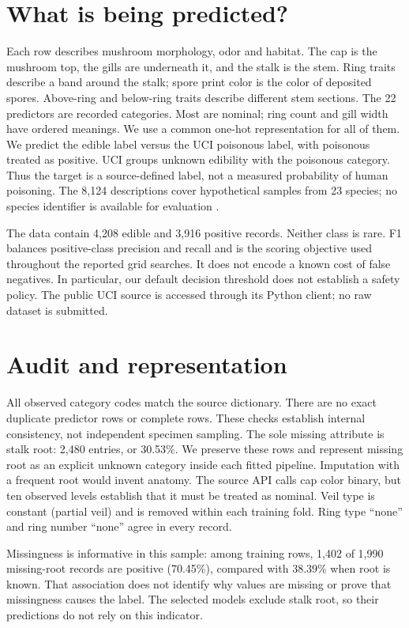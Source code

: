 \documentclass[11pt]{article}
\begin{document}
\section{What is being predicted?}
Each row describes mushroom morphology, odor and habitat. The cap is the mushroom top, the gills are underneath it, and the stalk is the stem. Ring traits describe a band around the stalk; spore print color is the color of deposited spores. Above-ring and below-ring traits describe different stem sections. The 22 predictors are recorded categories. Most are nominal; ring count and gill width have ordered meanings. We use a common one-hot representation for all of them. We predict the edible label versus the UCI poisonous label, with poisonous treated as positive. UCI groups unknown edibility with the poisonous category. Thus the target is a source-defined label, not a measured probability of human poisoning. The 8,124 descriptions cover hypothetical samples from 23 species; no species identifier is available for evaluation \cite{ucimushroom}.

The data contain 4,208 edible and 3,916 positive records. Neither class is rare. F1 balances positive-class precision and recall and is the scoring objective used throughout the reported grid searches. It does not encode a known cost of false negatives. In particular, our default decision threshold does not establish a safety policy. The public UCI source is accessed through its Python client; no raw dataset is submitted.

\section{Audit and representation}

All observed category codes match the source dictionary. There are no exact duplicate predictor rows or complete rows. These checks establish internal consistency, not independent specimen sampling. The sole missing attribute is stalk root: 2,480 entries, or 30.53\%. We preserve these rows and represent missing root as an explicit unknown category inside each fitted pipeline. Imputation with a frequent root would invent anatomy. The source API calls cap color binary, but ten observed levels establish that it must be treated as nominal. Veil type is constant (partial veil) and is removed within each training fold. Ring type ``none'' and ring number ``none'' agree in every record.

Missingness is informative in this sample: among training rows, 1,402 of 1,990 missing-root records are positive (70.45\%), compared with 38.39\% when root is known. That association does not identify why values are missing or prove that missingness causes the label. The selected models exclude stalk root, so their predictions do not rely on this indicator.
\end{document}
